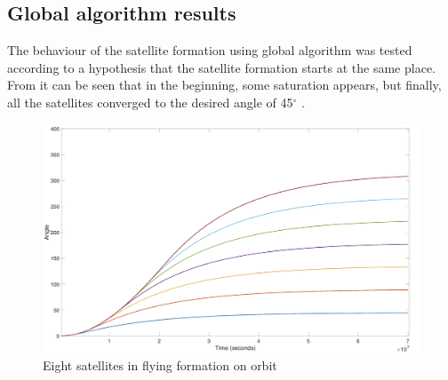 \subsection{Global algorithm results}
The behaviour of the satellite formation using global algorithm was tested according to a hypothesis that the satellite formation starts at the same place. From  it can be seen that in the beginning, some saturation appears, but finally, all the satellites converged to the desired angle of 45$^{\circ}$ .
\begin{figure}[H]
	\centering
	\includegraphics[width=1\linewidth]{figures/gl}
	\caption{Eight satellites in flying formation on orbit}
	\label{fig:forr}
\end{figure}
